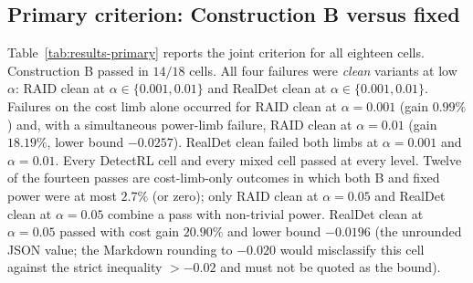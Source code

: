 \documentclass[pdflatex,sn-mathphys-num]{sn-jnl}
\begin{document}
\subsection{Primary criterion: Construction B versus fixed}

Table~\ref{tab:results-primary} reports the joint criterion for all eighteen cells. Construction B passed in \(14/18\) cells. All four failures were \emph{clean} variants at low \(\alpha\): RAID clean at \(\alpha\in\{0.001,0.01\}\) and RealDet clean at \(\alpha\in\{0.001,0.01\}\). Failures on the cost limb alone occurred for RAID clean at \(\alpha=0.001\) (gain \(0.99\%\)) and, with a simultaneous power-limb failure, RAID clean at \(\alpha=0.01\) (gain \(18.19\%\), lower bound \(-0.0257\)). RealDet clean failed both limbs at \(\alpha=0.001\) and \(\alpha=0.01\). Every DetectRL cell and every mixed cell passed at every level. Twelve of the fourteen passes are cost-limb-only outcomes in which both B and fixed power were at most \(2.7\%\) (or zero); only RAID clean at \(\alpha=0.05\) and RealDet clean at \(\alpha=0.05\) combine a pass with non-trivial power. RealDet clean at \(\alpha=0.05\) passed with cost gain \(20.90\%\) and lower bound \(-0.0196\) (the unrounded JSON value; the Markdown rounding to \(-0.020\) would misclassify this cell against the strict inequality \(>-0.02\) and must not be quoted as the bound).
\end{document}
